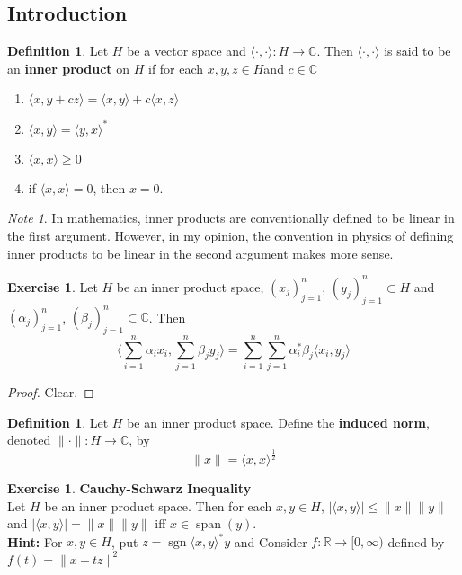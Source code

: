 \documentclass[12pt]{amsart}
\theoremstyle{definition}
\newtheorem{defn}[definition]{Definition}
\theoremstyle{remark}
\newtheorem{note}[remark]{Note}
\theoremstyle{definition}
\newtheorem{ex}[definition]{Exercise}
\newcommand{\al}{\alpha}
\newcommand{\be}{\beta}
\newcommand{\C}{\mathbb{C}}
\newcommand{\R}{\mathbb{R}}
\renewcommand{\r}{\rangle}
\renewcommand{\l}{\langle}
\newcommand{\Rg}{[0,\infty)}
\DeclareMathOperator{\sgn}{sgn}
\DeclareMathOperator{\spn}{span}
\begin{document}
	\subsection{Introduction}
	
	\begin{defn}
		Let $H$ be a vector space and $\l \cdot, \cdot \r: H \rightarrow \C$. Then $\l \cdot, \cdot \r$ is said to be an \textbf{inner product} on $H$ if for each $x,y,z \in H$and $c \in \C$
		\begin{enumerate}
			\item $\l x , y + cz\r = \l x , y \r + c\l x , z\r $
			\item $\l x , y \r = \l y , x\r^*$
			\item $\l x , x \r \geq 0$
			\item if $\l x ,x \r = 0$, then $x = 0$.  
		\end{enumerate}
	\end{defn}
	
	\begin{note}
	In mathematics, inner products are conventionally defined to be linear in the first argument. However, in my opinion, the convention in physics of defining inner products to be linear in the second argument makes more sense.
	\end{note}
	 
	\begin{ex}
	Let $H$ be an inner product space, $(x_j)_{j =1}^n$, $(y_j)_{j =1}^n \subset H$ and $(\al_j)_{j=1}^n$, $(\be_j)_{j=1}^n \subset \C$. Then $$\bigg \l \sum_{i=1}^n \al_i x_i , \sum_{j=1}^n \be_j y_j \bigg \r = \sum_{i=1}^n \sum_{j=1}^n \al_i^*\be_j \l x_i , y_j \r $$
\end{ex}

\begin{proof}
Clear.
\end{proof}

\begin{defn}
Let $H$ be an inner product space. Define the \textbf{induced norm}, denoted $\|\cdot \|: H \rightarrow \C$, by $$\|x\| = \l x, x\r^{\frac{1}{2}}$$
\end{defn}

\begin{ex} \textbf{Cauchy-Schwarz Inequality}\\
Let $H$ be an inner product space. Then for each $x,y \in H$, $| \l x, y\r | \leq \|x\| \| y\|$ and $| \l x, y\r | = \|x\| \| y\|$ iff $x \in \spn(y)$. \\
\textbf{Hint:} For $x, y \in H$, put $z = \sgn\l x, y \r^*y$ and Consider $f: \R \rightarrow \Rg$ defined by $f(t) = \|x - tz\|^2$
\end{ex}
\end{document}
